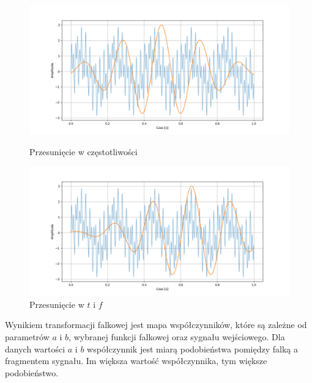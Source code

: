 \begin{figure}[ht]
    \centering
    \begin{minipage}[t]{0.46\linewidth}
        \includegraphics[width=\linewidth]{Rozdziały/02.Podstawy_teoretyczne/Obrazy/f_shift_morlet.png}
        \caption{Przesunięcie w częstotliwości}
        \label{fig:image36}
    \end{minipage}
    \centering
    \begin{minipage}[t]{0.46\linewidth}
        \includegraphics[width=\linewidth]{Rozdziały/02.Podstawy_teoretyczne/Obrazy/t_and_f_shift_morlet.png}
        \caption{Przesunięcie w $t$ i $f$}
        \label{fig:image37}
    \end{minipage}
\end{figure}


Wynikiem transformacji falkowej jest mapa współczynników, które są zależne od parametrów $a$ i $b$, wybranej funkcji falkowej oraz sygnału wejściowego. Dla danych wartości $a$ i $b$ współczynnik jest miarą podobieństwa pomiędzy falką a fragmentem sygnału. Im większa wartość współczynnika, tym większe podobieństwo.



